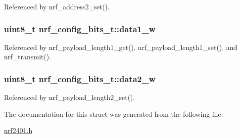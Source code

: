 Referenced by nrf\_\-address2\_\-set().\hypertarget{structnrf__config__bits__t_a0d3c8404b172ff4fe0c93576cbb24b6}{
\subsubsection{\setlength{\rightskip}{0pt plus 5cm}uint8\_\-t {\bf nrf\_\-config\_\-bits\_\-t::data1\_\-w}}}
\label{structnrf__config__bits__t_a0d3c8404b172ff4fe0c93576cbb24b6}




Referenced by nrf\_\-payload\_\-length1\_\-get(), nrf\_\-payload\_\-length1\_\-set(), and nrf\_\-transmit().\hypertarget{structnrf__config__bits__t_0c1bd7d7e3cac550eb25a2d5f3b76bcd}{
\subsubsection{\setlength{\rightskip}{0pt plus 5cm}uint8\_\-t {\bf nrf\_\-config\_\-bits\_\-t::data2\_\-w}}}
\label{structnrf__config__bits__t_0c1bd7d7e3cac550eb25a2d5f3b76bcd}




Referenced by nrf\_\-payload\_\-length2\_\-set().

The documentation for this struct was generated from the following file:\begin{CompactItemize}
\item 
\hyperlink{nrf2401_8h}{nrf2401.h}\end{CompactItemize}
